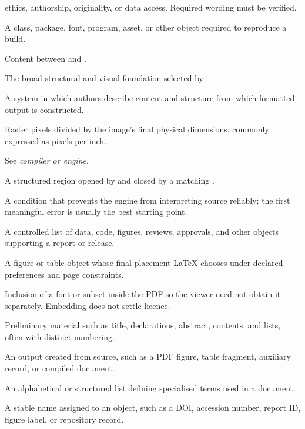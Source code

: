 \begin{description}[style=nextline,leftmargin=1.6em,itemsep=0.75em]
        ethics, authorship, originality, or data access. Required wording must be
        verified.
  \item[Dependency] A class, package, font, program, asset, or other object
        required to reproduce a build.
  \item[Document body] Content between
         and .
  \item[Document class] The broad structural and visual foundation selected by
        .
  \item[Document preparation system] A system in which authors describe content
        and structure from which formatted output is constructed.
  \item[Effective resolution] Raster pixels divided by the image's final physical
        dimensions, commonly expressed as pixels per inch.
  \item[Engine] See \emph{compiler or engine}.
  \item[Environment] A structured region opened by  and closed by a
        matching .
  \item[Error] A condition that prevents the engine from interpreting source
        reliably; the first meaningful error is usually the best starting point.
  \item[Evidence register] A controlled list of data, code, figures, reviews,
        approvals, and other objects supporting a report or release.
  \item[Float] A figure or table object whose final placement \LaTeX{} chooses under
        declared preferences and page constraints.
  \item[Font embedding] Inclusion of a font or subset inside the PDF so the
        viewer need not obtain it separately. Embedding does not settle licence.
  \item[Front matter] Preliminary material such as title, declarations, abstract,
        contents, and lists, often with distinct numbering.
  \item[Generated file] An output created from source, such as a PDF figure,
        table fragment, auxiliary record, or compiled document.
  \item[Glossary] An alphabetical or structured list defining specialised terms
        used in a document.
  \item[Identifier] A stable name assigned to an object, such as a DOI, accession
        number, report ID, figure label, or repository record.

\end{description}
